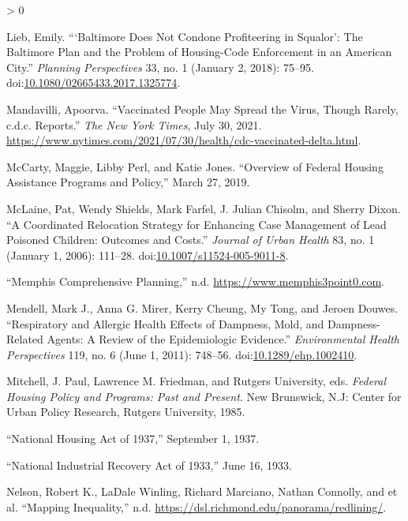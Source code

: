 \documentclass[
  openany]{book}
\newlength{\cslhangindent}
\newenvironment{CSLReferences}[2] %
 {%
  \setlength{\parindent}{0pt}
  \ifodd #1 \everypar{\setlength{\hangindent}{\cslhangindent}}\ignorespaces\fi
  \ifnum #2 > 0
  \setlength{\parskip}{#2\baselineskip}
  \fi
 }%
 {}
\begin{document}
\begin{CSLReferences}{1}{0}
\leavevmode\hypertarget{ref-lieb2018}{}%
Lieb, Emily. {``{`}Baltimore Does Not Condone Profiteering in Squalor{'}: The Baltimore Plan and the Problem of Housing-Code Enforcement in an American City.''} \emph{Planning Perspectives} 33, no. 1 (January 2, 2018): 75--95. doi:\href{https://doi.org/10.1080/02665433.2017.1325774}{10.1080/02665433.2017.1325774}.

\leavevmode\hypertarget{ref-mandavilli2021}{}%
Mandavilli, Apoorva. {``Vaccinated People May Spread the Virus, Though Rarely, c.d.c. Reports.''} \emph{The New York Times}, July 30, 2021. \url{https://www.nytimes.com/2021/07/30/health/cdc-vaccinated-delta.html}.

\leavevmode\hypertarget{ref-mccarty2019}{}%
McCarty, Maggie, Libby Perl, and Katie Jones. {``Overview of Federal Housing Assistance Programs and Policy,''} March 27, 2019.

\leavevmode\hypertarget{ref-mclaine2006}{}%
McLaine, Pat, Wendy Shields, Mark Farfel, J. Julian Chisolm, and Sherry Dixon. {``A Coordinated Relocation Strategy for Enhancing Case Management of Lead Poisoned Children: Outcomes and Costs.''} \emph{Journal of Urban Health} 83, no. 1 (January 1, 2006): 111--28. doi:\href{https://doi.org/10.1007/s11524-005-9011-8}{10.1007/s11524-005-9011-8}.

\leavevmode\hypertarget{ref-memphis30}{}%
{``Memphis Comprehensive Planning,''} n.d. \url{https://www.memphis3point0.com}.

\leavevmode\hypertarget{ref-mendell2011}{}%
Mendell, Mark J., Anna G. Mirer, Kerry Cheung, My Tong, and Jeroen Douwes. {``Respiratory and Allergic Health Effects of Dampness, Mold, and Dampness-Related Agents: A Review of the Epidemiologic Evidence.''} \emph{Environmental Health Perspectives} 119, no. 6 (June 1, 2011): 748--56. doi:\href{https://doi.org/10.1289/ehp.1002410}{10.1289/ehp.1002410}.

\leavevmode\hypertarget{ref-federal1985}{}%
Mitchell, J. Paul, Lawrence M. Friedman, and Rutgers University, eds. \emph{Federal Housing Policy and Programs: Past and Present}. New Brunswick, N.J: Center for Urban Policy Research, Rutgers University, 1985.

\leavevmode\hypertarget{ref-national1937}{}%
{``National Housing Act of 1937,''} September 1, 1937.

\leavevmode\hypertarget{ref-national1933}{}%
{``National Industrial Recovery Act of 1933,''} June 16, 1933.

\leavevmode\hypertarget{ref-nelson}{}%
Nelson, Robert K., LaDale Winling, Richard Marciano, Nathan Connolly, and et al. {``Mapping Inequality,''} n.d. \url{https://dsl.richmond.edu/panorama/redlining/}.


\end{CSLReferences}
\end{document}

